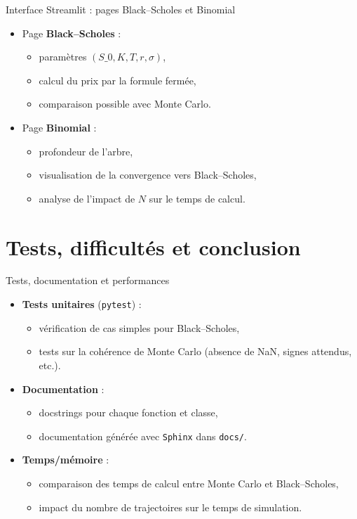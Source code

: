 \documentclass[aspectratio=169]{beamer}
\begin{document}
\begin{frame}{Interface Streamlit : pages Black--Scholes et Binomial}
  \begin{itemize}
    \item Page \textbf{Black--Scholes} :
    \begin{itemize}
      \item param\`etres $(S\_0, K, T, r, \sigma)$,
      \item calcul du prix par la formule ferm\'ee,
      \item comparaison possible avec Monte Carlo.
    \end{itemize}
    \item Page \textbf{Binomial} :
    \begin{itemize}
      \item profondeur de l'arbre,
      \item visualisation de la convergence vers Black--Scholes,
      \item analyse de l'impact de $N$ sur le temps de calcul.
    \end{itemize}
  \end{itemize}
\end{frame}

\section{Tests, difficult\'es et conclusion}

\begin{frame}{Tests, documentation et performances}
  \begin{itemize}
    \item \textbf{Tests unitaires} (\texttt{pytest}) :
    \begin{itemize}
      \item v\'erification de cas simples pour Black--Scholes,
      \item tests sur la coh\'erence de Monte Carlo (absence de NaN, signes attendus, etc.).
    \end{itemize}
    \item \textbf{Documentation} :
    \begin{itemize}
      \item docstrings pour chaque fonction et classe,
      \item documentation g\'en\'er\'ee avec \texttt{Sphinx} dans \texttt{docs/}.
    \end{itemize}
    \item \textbf{Temps/m\'emoire} :
    \begin{itemize}
      \item comparaison des temps de calcul entre Monte Carlo et Black--Scholes,
      \item impact du nombre de trajectoires sur le temps de simulation.
    \end{itemize}
  \end{itemize}
\end{frame}
\end{document}
